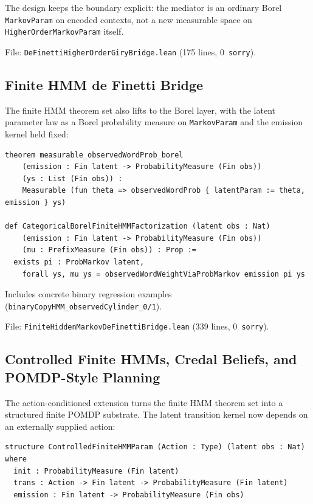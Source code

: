 \documentclass[11pt,a4paper]{article}
\theoremstyle{definition}
\begin{document}
The design keeps the boundary explicit: the mediator is an ordinary Borel
\texttt{MarkovParam} on encoded contexts, not a new measurable space on
\texttt{HigherOrderMarkovParam} itself.

File: \texttt{DeFinettiHigherOrderGiryBridge.lean} (175 lines, 0~\texttt{sorry}).

\subsection{Finite HMM de Finetti Bridge}

The finite HMM theorem set also lifts to the Borel layer, with the latent
parameter law as a Borel probability measure on \texttt{MarkovParam} and
the emission kernel held fixed:

\begin{lstlisting}
theorem measurable_observedWordProb_borel
    (emission : Fin latent -> ProbabilityMeasure (Fin obs))
    (ys : List (Fin obs)) :
    Measurable (fun theta => observedWordProb { latentParam := theta, emission } ys)

def CategoricalBorelFiniteHMMFactorization (latent obs : Nat)
    (emission : Fin latent -> ProbabilityMeasure (Fin obs))
    (mu : PrefixMeasure (Fin obs)) : Prop :=
  exists pi : ProbMarkov latent,
    forall ys, mu ys = observedWordWeightViaProbMarkov emission pi ys
\end{lstlisting}

Includes concrete binary regression examples (\texttt{binaryCopyHMM\_observedCylinder\_0/1}).

File: \texttt{FiniteHiddenMarkovDeFinettiBridge.lean} (339 lines, 0~\texttt{sorry}).

\subsection{Controlled Finite HMMs, Credal Beliefs, and POMDP-Style Planning}

The action-conditioned extension turns the finite HMM theorem set into a structured
finite POMDP substrate.  The latent transition kernel now depends on an
externally supplied action:

\begin{lstlisting}
structure ControlledFiniteHMMParam (Action : Type) (latent obs : Nat) where
  init : ProbabilityMeasure (Fin latent)
  trans : Action -> Fin latent -> ProbabilityMeasure (Fin latent)
  emission : Fin latent -> ProbabilityMeasure (Fin obs)
\end{lstlisting}
\end{document}
